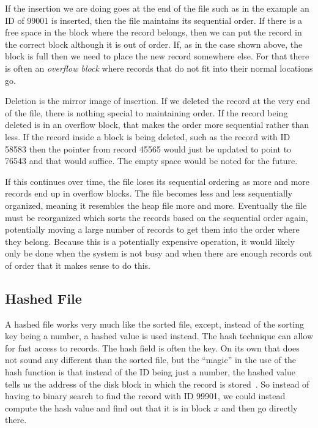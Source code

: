 If the insertion we are doing goes at the end of the file such as in the example an ID of 99001 is inserted, then the file maintains its sequential order. If there is a free space in the block where the record belongs, then we can put the record in the correct block although it is out of order. If, as in the case shown above, the block is full then we need to place the new record somewhere else. For that there is often an \textit{overflow block} where records that do not fit into their normal locations go. 

Deletion is the mirror image of insertion. If we deleted the record at the very end of the file, there is nothing special to maintaining order. If the record being deleted is in an overflow block, that makes the order more sequential rather than less. If the record inside a block is being deleted, such as the record with ID 58583 then the pointer from record 45565 would just be updated to point to 76543 and that would suffice. The empty space would be noted for the future. 

If this continues over time, the file loses its sequential ordering as more and more records end up in overflow blocks. The file becomes less and less sequentially organized, meaning it resembles the heap file more and more. Eventually the file must be reorganized which sorts the records based on the sequential order again, potentially moving a large number of records to get them into the order where they belong. Because this is a potentially expensive operation, it would likely only be done when the system is not busy and when there are enough records out of order that it makes sense to do this. 

\subsection*{Hashed File}

A hashed file works very much like the sorted file, except, instead of the sorting key being a number, a hashed value is used instead. The hash technique can allow for fast access to records. The hash field is often the key. On its own that does not sound any different than the sorted file, but the ``magic'' in the use of the hash function is that instead of the ID being just a number, the hashed value tells us the address of the disk block in which the record is stored~\cite{fds}. So instead of having to binary search to find the record with ID 99901, we could instead compute the hash value and find out that it is in block $x$ and then go directly there.

